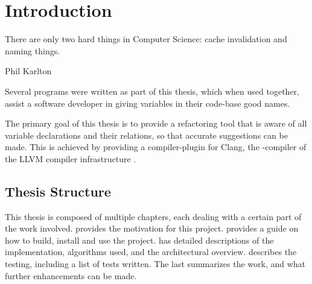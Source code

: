 \chapter{Introduction}
\label{chap:Introduction}

\epigraph{There are only two hard things in Computer Science: cache invalidation
	and naming things.}{Phil Karlton}

Several programs were written as part of this thesis, which when used together,
assist a software developer in giving variables in their \CC{} code-base good
names.

The primary goal of this thesis is to provide a refactoring tool that is aware
of all variable declarations and their relations, so that accurate suggestions
can be made. This is achieved by providing a compiler-plugin for Clang, the
\CC{}-compiler of the LLVM compiler infrastructure \cite{llvm}.

\section{Thesis Structure}
This thesis is composed of multiple chapters, each dealing with a certain part
of the work involved.
 provides the motivation for this project.
 provides a guide on how to build, install and use the
project.
 has detailed descriptions of the implementation,
algorithms used, and the architectural overview.
 describes the testing, including a list of tests written.
The last  summarizes the work, and what further
enhancements can be made.
